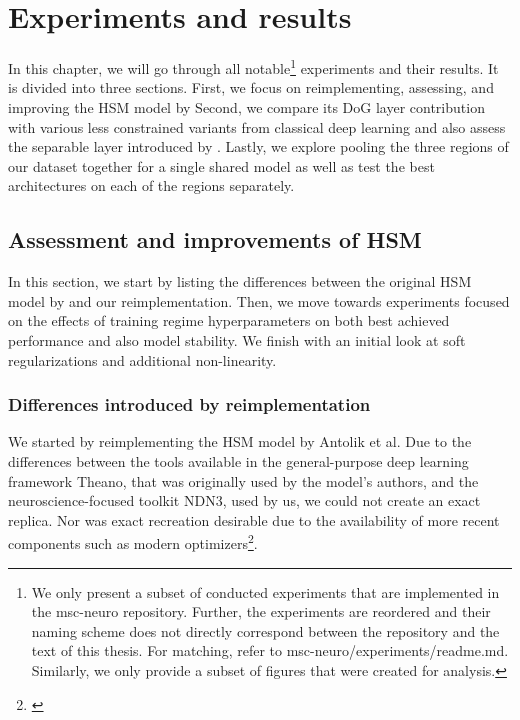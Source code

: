 \renewcommand*\thesubsubsection{\arabic{section}.\arabic{subsection}.\arabic{subsubsection}}
\setlength{\abovecaptionskip}{0pt plus 0pt minus 0pt} %

\chapter{Experiments and results}\label{ch:5}

In this chapter, we will go through all notable\footnote{We only present a subset of conducted experiments that are implemented in the msc-neuro repository. Further, the experiments are reordered and their naming scheme does not directly correspond between the repository and the text of this thesis. For matching, refer to msc-neuro/experiments/readme.md. Similarly, we only provide a subset of figures that were created for analysis.} experiments and their results. It is divided into three sections. First, we focus on reimplementing, assessing, and improving the HSM model by \cite{antolik} Second, we compare its DoG layer contribution with various less constrained variants from classical deep learning and also assess the separable layer introduced by \cite{klidnt}. Lastly, we explore pooling the three regions of our dataset together for a single shared model as well as test the best architectures on each of the regions separately.


\section{Assessment and improvements of HSM}

In this section, we start by listing the differences between the original HSM model by \citeauthor{antolik} and our reimplementation. Then, we move towards experiments focused on the effects of training regime hyperparameters on both best achieved performance and also model stability. We finish with an initial look at soft regularizations and additional non-linearity.

\addtocounter{subsection}{-1} %
\subsection{Differences introduced by reimplementation}\label{ch:5.1.0}

We started by reimplementing the HSM model by Antolik et al. Due to the differences between the tools available in the general-purpose deep learning framework Theano, that was originally used by the model’s authors, and the neuroscience-focused toolkit NDN3, used by us, we could not create an exact replica. Nor was exact recreation desirable due to the availability of more recent components such as modern optimizers\footnote{\cite{2016arXiv160904747R}}.

